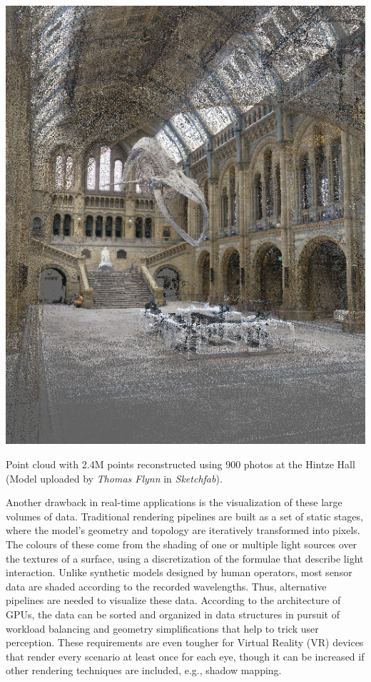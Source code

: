 \begin{marginfigure}[.5cm]
	\includegraphics{figs/introduction/hintze.png}
	\caption{Point cloud with 2.4M points reconstructed using 900 photos at the Hintze Hall (Model uploaded by \textit{Thomas Flynn} in \textit{Sketchfab}).  }
	\label{fig:hintze_hall}
\end{marginfigure}
Another drawback in real-time applications is the visualization of these large volumes of data. Traditional rendering pipelines are built as a set of static stages, where the model's geometry and topology are iteratively transformed into pixels. The colours of these come from the shading of one or multiple light sources over the textures of a surface, using a discretization of the formulae that describe light interaction. Unlike synthetic models designed by human operators, most sensor data are shaded according to the recorded wavelengths. Thus, alternative pipelines are needed to visualize these data. According to the architecture of GPUs, the data can be sorted and organized in data structures in pursuit of workload balancing and geometry simplifications that help to trick user perception. These requirements are even tougher for Virtual Reality (VR) devices that render every scenario at least once for each eye, though it can be increased if other rendering techniques are included, e.g., shadow mapping.  

